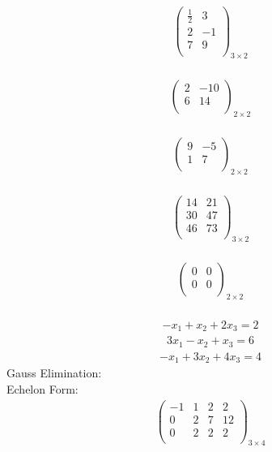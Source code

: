 \documentclass{article}
\begin{document}
\begin{align*}
\begin{pmatrix}
\frac{1}{2} & 3\\
2 & -1\\
7 & 9\\
\end{pmatrix}_{3\times 2}
\end{align*}
\\
\begin{align*}
\begin{pmatrix}
2 & -10\\
6 & 14\\
\end{pmatrix}_{2\times 2}
\end{align*}
\\
\begin{align*}
\begin{pmatrix}
9 & -5\\
1 & 7\\
\end{pmatrix}_{2\times 2}
\end{align*}
\\
\begin{align*}
\begin{pmatrix}
14 & 21\\
30 & 47\\
46 & 73\\
\end{pmatrix}_{3\times 2}
\end{align*}
\\
\begin{align*}
\begin{pmatrix}
0 & 0\\
0 & 0\\
\end{pmatrix}_{2\times 2}
\end{align*}
\\
\begin{align*}
-x_{1} + x_{2} + 2x_{3} = 2\end{align*}
\begin{align*}
3x_{1} - x_{2} + x_{3} = 6\end{align*}
\begin{align*}
-x_{1} + 3x_{2} + 4x_{3} = 4\end{align*}
Gauss Elimination:\\
Echelon Form:\\
\begin{align*}
\left(
\begin{array}{ccc|c}
-1 & 1 & 2 & 2\\
0 & 2 & 7 & 12\\
0 & 2 & 2 & 2\\
\end{array}
\right)_{3\times 4}
\end{align*}
\end{document}

